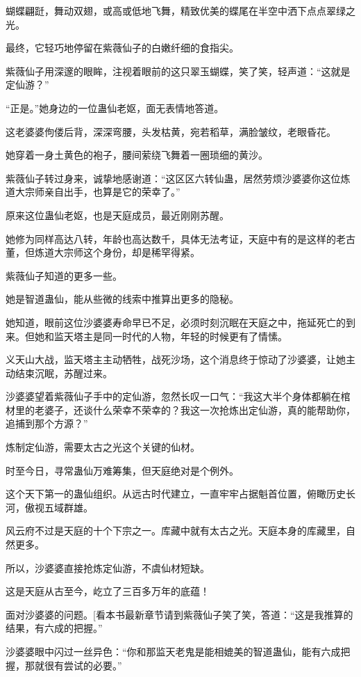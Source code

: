 
\begin{this_body}

蝴蝶翩跹，舞动双翅，或高或低地飞舞，精致优美的蝶尾在半空中洒下点点翠绿之光。

最终，它轻巧地停留在紫薇仙子的白嫩纤细的食指尖。

紫薇仙子用深邃的眼眸，注视着眼前的这只翠玉蝴蝶，笑了笑，轻声道：“这就是定仙游？”

“正是。”她身边的一位蛊仙老妪，面无表情地答道。

这老婆婆佝偻后背，深深弯腰，头发枯黄，宛若稻草，满脸皱纹，老眼昏花。

她穿着一身土黄色的袍子，腰间萦绕飞舞着一圈琐细的黄沙。

紫薇仙子转过身来，诚挚地感谢道：“这区区六转仙蛊，居然劳烦沙婆婆你这位炼道大宗师亲自出手，也算是它的荣幸了。”

原来这位蛊仙老妪，也是天庭成员，最近刚刚苏醒。

她修为同样高达八转，年龄也高达数千，具体无法考证，天庭中有的是这样的老古董，但炼道大宗师这个身份，却是稀罕得紧。

紫薇仙子知道的更多一些。

她是智道蛊仙，能从些微的线索中推算出更多的隐秘。

她知道，眼前这位沙婆婆寿命早已不足，必须时刻沉眠在天庭之中，拖延死亡的到来。但她和监天塔主是同一时代的人物，年轻的时候更有了情愫。

义天山大战，监天塔主主动牺牲，战死沙场，这个消息终于惊动了沙婆婆，让她主动结束沉眠，苏醒过来。

沙婆婆望着紫薇仙子手中的定仙游，忽然长叹一口气：“我这大半个身体都躺在棺材里的老婆子，还谈什么荣幸不荣幸的？我这一次抢炼出定仙游，真的能帮助你，追捕到那个方源？”

炼制定仙游，需要太古之光这个关键的仙材。

时至今日，寻常蛊仙万难筹集，但天庭绝对是个例外。

这个天下第一的蛊仙组织。从远古时代建立，一直牢牢占据魁首位置，俯瞰历史长河，傲视五域群雄。

风云府不过是天庭的十个下宗之一。库藏中就有太古之光。天庭本身的库藏里，自然更多。

所以，沙婆婆直接抢炼定仙游，不虞仙材短缺。

这是天庭从古至今，屹立了三百多万年的底蕴！

面对沙婆婆的问题。[看本书最新章节请到紫薇仙子笑了笑，答道：“这是我推算的结果，有六成的把握。”

沙婆婆眼中闪过一丝异色：“你和那监天老鬼是能相媲美的智道蛊仙，能有六成把握，那就很有尝试的必要。”


\end{this_body}
